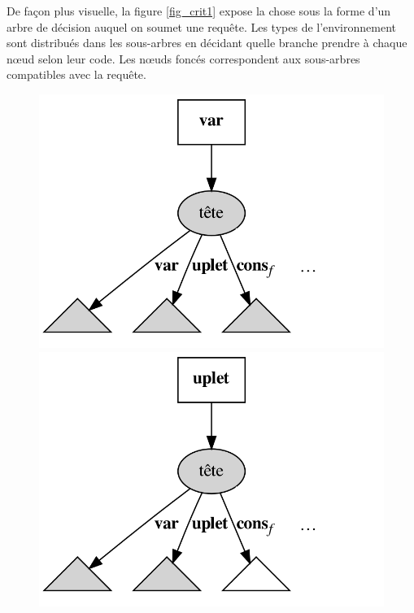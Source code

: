 \documentclass[a4paper]{report}
\theoremstyle{definition}
\begin{document}
De façon plus visuelle, la figure \ref{fig_crit1} expose la chose sous la forme d'un arbre de décision auquel on soumet une requête. Les types de l'environnement sont distribués dans les sous-arbres en décidant quelle branche prendre à chaque nœud selon leur code. Les nœuds foncés correspondent aux sous-arbres compatibles avec la requête.

\begin{figure}[h]
	\begin{center}
		\includegraphics[scale=0.13]{graphs/crit1_1}
		\includegraphics[scale=0.13]{graphs/crit1_2}

\end{center}
\end{figure}
\end{document}
